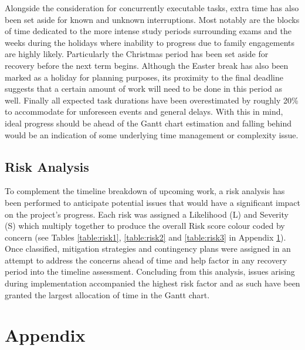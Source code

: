 \documentclass[12pt,a4,xcolor=table]{article}
\begin{document}
Alongside the consideration for concurrently executable tasks, extra time has also been set aside for known and unknown interruptions. Most notably are the blocks of time dedicated to the more intense study periods surrounding exams and the weeks during the holidays where inability to progress due to family engagements are highly likely. Particularly the Christmas period has been set aside  for recovery before the next term begins. Although the Easter break has also been marked as a holiday for planning purposes, its proximity to the final deadline suggests that a certain amount of work will need to be done in this period as well. Finally all expected task durations have been overestimated by roughly 20\% to accommodate for unforeseen events and general delays. With this in mind, ideal progress should be ahead of the Gantt chart estimation and falling behind would be an indication of some underlying time management or complexity issue.

\subsection{Risk Analysis}

To complement the timeline breakdown of upcoming work, a risk analysis has been performed to anticipate potential issues that would have a significant impact on the project's progress. Each risk was assigned a Likelihood (L) and Severity (S) which multiply together to produce the overall Risk score colour coded by concern (see Tables  \ref{table:risk1}, \ref{table:risk2} and \ref{table:risk3} in Appendix \ref{sec:app}). Once classified, mitigation strategies and contingency plans were assigned in an attempt to address the concerns ahead of time and help factor in any recovery period into the timeline assessment. Concluding from this analysis, issues arising during implementation accompanied the highest risk factor and as such have been granted the largest allocation of time in the Gantt chart.

\newpage
\appendix
\section{Appendix}
\label{sec:app}
\end{document}
